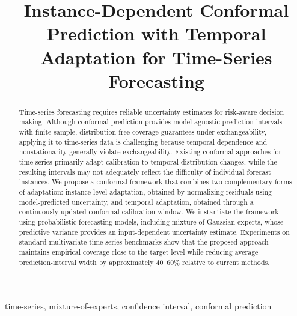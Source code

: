 \documentclass{article}
\begin{document}
\title{Instance-Dependent Conformal Prediction with Temporal Adaptation for Time-Series Forecasting}


\author{
\and
{}
\and
{}
}


\newtheorem{proposition}{Proposition}




\maketitle

\begin{abstract}
Time-series forecasting requires reliable uncertainty estimates for risk-aware decision making. 
Although conformal prediction provides model-agnostic prediction intervals with finite-sample, distribution-free coverage guarantees under exchangeability, applying it to time-series data is challenging because temporal dependence and nonstationarity generally violate exchangeability.
Existing conformal approaches for time series primarily adapt calibration to temporal distribution changes, while the resulting intervals may not adequately reflect the difficulty of individual forecast instances. We propose a conformal framework that combines two complementary forms of adaptation: instance-level adaptation, obtained by normalizing residuals using model-predicted uncertainty, and temporal adaptation, obtained through a continuously updated conformal calibration window. We instantiate the framework using probabilistic forecasting models, including mixture-of-Gaussian experts, whose predictive variance provides an input-dependent uncertainty estimate.
Experiments on standard multivariate time-series benchmarks show that the proposed approach maintains empirical coverage close to the target level while reducing average prediction-interval width by approximately 40–60\% relative to current methods.


\end{abstract}

\begin{keywords}
time-series, mixture-of-experts, confidence interval, conformal prediction
\end{keywords}








\small


\end{document}
